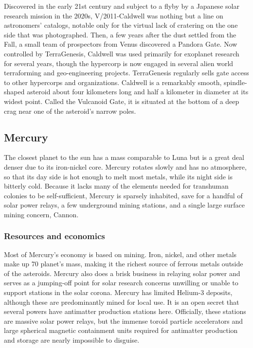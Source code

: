 Discovered in the early 21st century and subject to a flyby by a
Japanese solar research mission in the 2020s, V/2011-Caldwell was
nothing but a line on astronomers' catalogs, notable only for the
virtual lack of cratering on the one side that was photographed. Then,
a few years after the dust settled from the Fall, a small team of
prospectors from Venus discovered a Pandora Gate. Now controlled by
TerraGenesis, Caldwell was used primarily for exoplanet research for
several years, though the hypercorp is now engaged in several alien
world terraforming and geo-engineering projects. TerraGenesis
regularly sells gate access to other hypercorps and
organizations. Caldwell is a remarkably smooth, spindle-shaped
asteroid about four kilometers long and half a kilometer in diameter
at its widest point. Called the Vulcanoid Gate, it is situated at the
bottom of a deep crag near one of the asteroid's narrow poles.

\subsection{Mercury}
\label{sec:mercury}

The closest planet to the sun has a mass comparable
to Luna but is a great deal denser due to its iron-nickel
core. Mercury rotates slowly and has no atmosphere,
so that its day side is hot enough to melt most metals,
while its night side is bitterly cold. Because it lacks
many of the elements needed for transhuman colonies
to be self-sufficient, Mercury is sparsely inhabited,
save for a handful of solar power relays, a few underground mining stations, and a single large surface
mining concern, Cannon.

\subsubsection{Resources and economics}
\label{sec:resources-economics}

Most of Mercury's economy is based on mining.  Iron, nickel, and other
metals make up 70%
planet's mass, making it the richest source of ferrous metals outside
of the asteroids. Mercury also does a brisk business in relaying solar
power and serves as a jumping-off point for solar research concerns
unwilling or unable to support stations in the solar corona.  Mercury
has limited Helium-3 deposits, although these are predominantly mined
for local use. It is an open secret that several powers have
antimatter production stations here. Officially, these stations are
massive solar power relays, but the immense toroid particle
accelerators and large spherical magnetic containment units required
for antimatter production and storage are nearly impossible to
disguise.

